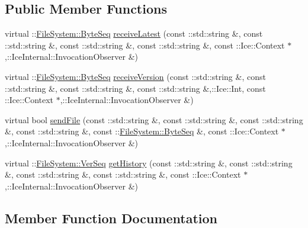 \subsection*{Public Member Functions}
\begin{DoxyCompactItemize}
\item 
virtual \+::\hyperlink{namespace_file_system_a5c85de065f9c451ae1d1dea2dacb68c5}{File\+System\+::\+Byte\+Seq} \hyperlink{class_ice_delegate_d_1_1_file_system_1_1_file_add54fa82d12f5bbbc8fcc00e44aa0438}{receive\+Latest} (const \+::std\+::string \&, const \+::std\+::string \&, const \+::std\+::string \&, const \+::std\+::string \&, const \+::Ice\+::\+Context $\ast$,\+::Ice\+Internal\+::\+Invocation\+Observer \&)
\item 
virtual \+::\hyperlink{namespace_file_system_a5c85de065f9c451ae1d1dea2dacb68c5}{File\+System\+::\+Byte\+Seq} \hyperlink{class_ice_delegate_d_1_1_file_system_1_1_file_ac1937c3e49ac89a8794073205558edea}{receive\+Version} (const \+::std\+::string \&, const \+::std\+::string \&, const \+::std\+::string \&, const \+::std\+::string \&,\+::Ice\+::\+Int, const \+::Ice\+::\+Context $\ast$,\+::Ice\+Internal\+::\+Invocation\+Observer \&)
\item 
virtual bool \hyperlink{class_ice_delegate_d_1_1_file_system_1_1_file_a219881647e8715fbf6e0f76d172b72b1}{send\+File} (const \+::std\+::string \&, const \+::std\+::string \&, const \+::std\+::string \&, const \+::std\+::string \&, const \+::\hyperlink{namespace_file_system_a5c85de065f9c451ae1d1dea2dacb68c5}{File\+System\+::\+Byte\+Seq} \&, const \+::Ice\+::\+Context $\ast$,\+::Ice\+Internal\+::\+Invocation\+Observer \&)
\item 
virtual \+::\hyperlink{namespace_file_system_ac32dc1eb34c060160b52edc7c4e37d6e}{File\+System\+::\+Ver\+Seq} \hyperlink{class_ice_delegate_d_1_1_file_system_1_1_file_a4c0d32d5c6c2ce51f5315e1f0dd4cf47}{get\+History} (const \+::std\+::string \&, const \+::std\+::string \&, const \+::std\+::string \&, const \+::std\+::string \&, const \+::Ice\+::\+Context $\ast$,\+::Ice\+Internal\+::\+Invocation\+Observer \&)
\end{DoxyCompactItemize}


\subsection{Member Function Documentation}
\hypertarget{class_ice_delegate_d_1_1_file_system_1_1_file_a4c0d32d5c6c2ce51f5315e1f0dd4cf47}{}
